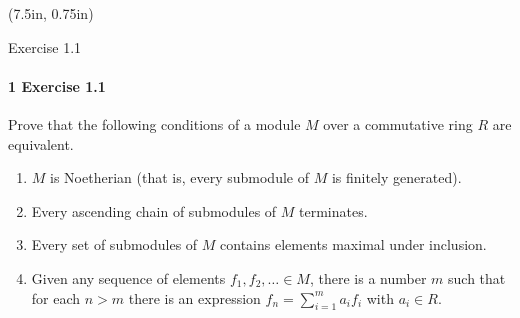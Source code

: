 \documentclass[12pt]{article}
\newlength{\myparskip}
\newenvironment{fullbox}{\begin{lrbox}{\savefullbox}\begin{minipage}{\dimexpr\textwidth-2\fboxsep\relax}\setlength{\parskip}{\myparskip}}{\end{minipage}\end{lrbox}\framebox[\textwidth]{\usebox{\savefullbox}}}
\newenvironment{pbox}[1][]{\begin{fullbox}\ifx#1\empty\else\paragraph{#1}\fi}{\end{fullbox}}
\newcommand{\<}{\langle}
\renewcommand{\>}{\rangle}
\begin{document}
\thispagestyle{title}

\begin{textblock*}{0in}(7.5in, 0.75in)
\end{textblock*}

\begin{pbox}[1 Exercise 1.1]
    Prove that the following conditions of a module $M$ over a commutative ring $R$ are equivalent.
    \begin{enumerate}
        \item $M$ is Noetherian (that is, every submodule of $M$ is finitely generated).
        \item Every ascending chain of submodules of $M$ terminates.
        \item Every set of submodules of $M$ contains elements maximal under inclusion.
        \item Given any sequence of elements $f_1, f_2, \ldots \in M$, there is a number $m$ such that for each $n > m$ there is an expression $f_n = \sum_{i = 1}^{m} a_if_i$ with $a_i \in R$.
    \end{enumerate}
\end{pbox}
\end{document}
